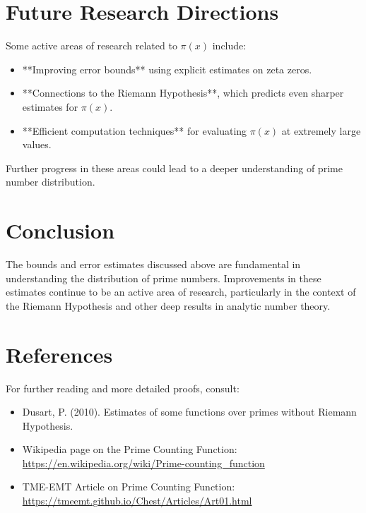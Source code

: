 \section{Future Research Directions}
Some active areas of research related to $\pi(x)$ include:
\begin{itemize}
    \item **Improving error bounds** using explicit estimates on zeta zeros.
    \item **Connections to the Riemann Hypothesis**, which predicts even sharper estimates for $\pi(x)$.
    \item **Efficient computation techniques** for evaluating $\pi(x)$ at extremely large values.
\end{itemize}
Further progress in these areas could lead to a deeper understanding of prime number distribution.

\section{Conclusion}
The bounds and error estimates discussed above are fundamental in understanding the distribution of prime numbers. Improvements in these estimates continue to be an active area of research, particularly in the context of the Riemann Hypothesis and other deep results in analytic number theory.

\section{References}
For further reading and more detailed proofs, consult:
\begin{itemize}
    \item Dusart, P. (2010). Estimates of some functions over primes without Riemann Hypothesis.
    \item Wikipedia page on the Prime Counting Function: \url{https://en.wikipedia.org/wiki/Prime-counting_function}
    \item TME-EMT Article on Prime Counting Function: \url{https://tmeemt.github.io/Chest/Articles/Art01.html}
\end{itemize}
